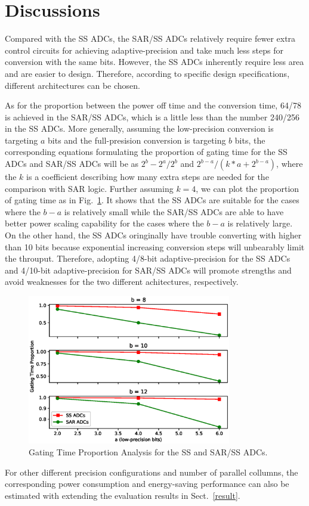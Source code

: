 \section{Discussions}\label{discussion}

Compared with the SS ADCs, the SAR/SS ADCs relatively require fewer extra control circuits for achieving adaptive-precision and take much less steps for conversion with the same bits. However, the SS ADCs inherently require less area and are easier to design. Therefore, according to specific design specifications, different architectures can be chosen. 

As for the proportion between the power off time and the conversion time, 64/78 is achieved in the SAR/SS ADCs, which is a little less than the number 240/256 in the SS ADCs. More generally, assuming the low-precision conversion is targeting $a$ bits and the full-presision conversion is targeting $b$ bits, the corresponding equations formulating the proportion of gating time for the SS ADCs and SAR/SS ADCs will be as $2^b-2^a/2^b$ and $2^{b-a}/(k*a+2^{b-a})$, where the $k$ is a coefficient describing how many extra steps are needed for the comparison with SAR logic. Further assuming $k=4$, we can plot the proportion of gating time as in Fig.~\ref{Proportion}.
It shows that the SS ADCs are suitable for the cases where the $b-a$ is relatively small while the SAR/SS ADCs are able to have better power scaling capability for the cases where the $b-a$ is relatively large. On the other hand, the SS ADCs oringinally have trouble converting with higher than 10 bits because exponential increasing conversion steps will unbearably limit the throuput. 
Therefore, adopting 4/8-bit adaptive-precision for the SS ADCs and 4/10-bit adaptive-precision for SAR/SS ADCs will promote strengths and avoid weaknesses for the two different achitectures, respectively.

\begin{figure}[htbp]
	\centerline{\includegraphics[width=3.5in]{./Figures/Proportion.eps}}
	\caption{Gating Time Proportion Analysis for the SS and SAR/SS ADCs.}
	\label{Proportion}
\end{figure} 

For other different precision configurations and number of parallel collumns, 
the corresponding power consumption and energy-saving performance can also be estimated with extending the evaluation results in Sect.~\ref{result}.